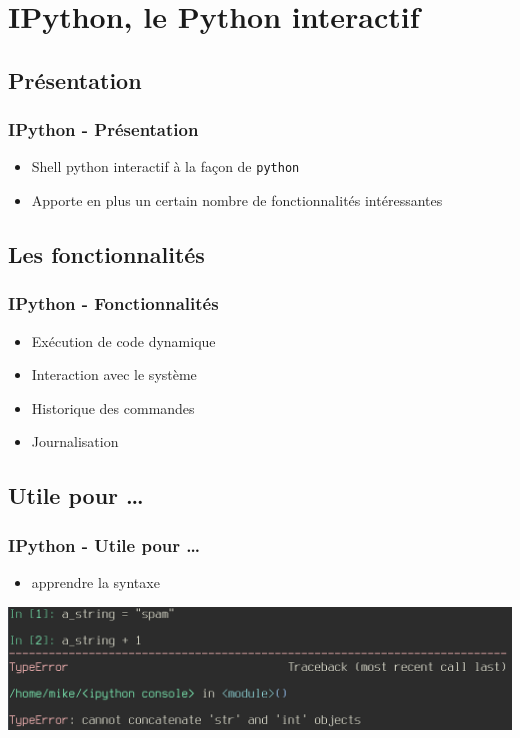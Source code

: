 \section{IPython, le Python interactif}

\subsection{Présentation}
\begin{frame}[fragile]
  \frametitle{IPython - Présentation}
  \begin{itemize}
    \item Shell python interactif à la façon de \verb=python=
    \item Apporte en plus un certain nombre de fonctionnalités intéressantes
  \end{itemize}
\end{frame}

\subsection{Les fonctionnalités}
\begin{frame}
  \frametitle{IPython - Fonctionnalités}
  \begin{itemize}
    \item Exécution de code dynamique
    \item Interaction avec le système
    \item Historique des commandes
    \item Journalisation
  \end{itemize}
\end{frame}

\subsection{Utile pour \ldots}
\begin{frame}[fragile]
  \frametitle{IPython - Utile pour \ldots}
    \begin{itemize}
      \item apprendre la syntaxe
    \end{itemize}
  \includegraphics[scale=0.35]{medias/apprendre.png}

\end{frame}

